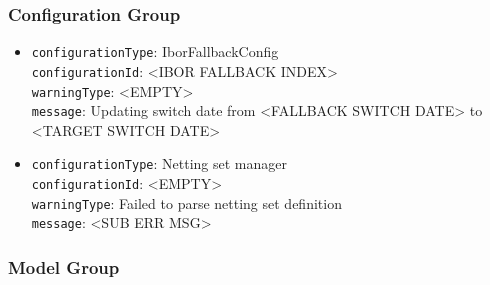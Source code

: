 \subsubsection*{Configuration Group}

\begin{itemize}

  \item \lstinline!configurationType!: IborFallbackConfig \\
        \lstinline!configurationId!: <IBOR FALLBACK INDEX> \\
        \lstinline!warningType!: <EMPTY> \\
        \lstinline!message!: Updating switch date from <FALLBACK SWITCH DATE> to <TARGET SWITCH DATE>

  \item \lstinline!configurationType!: Netting set manager \\
        \lstinline!configurationId!: <EMPTY> \\
        \lstinline!warningType!: Failed to parse netting set definition \\
        \lstinline!message!: <SUB ERR MSG>

  \ifdefined\UserGuide
  \else
    
  \fi

\end{itemize}

\subsubsection*{Model Group}

